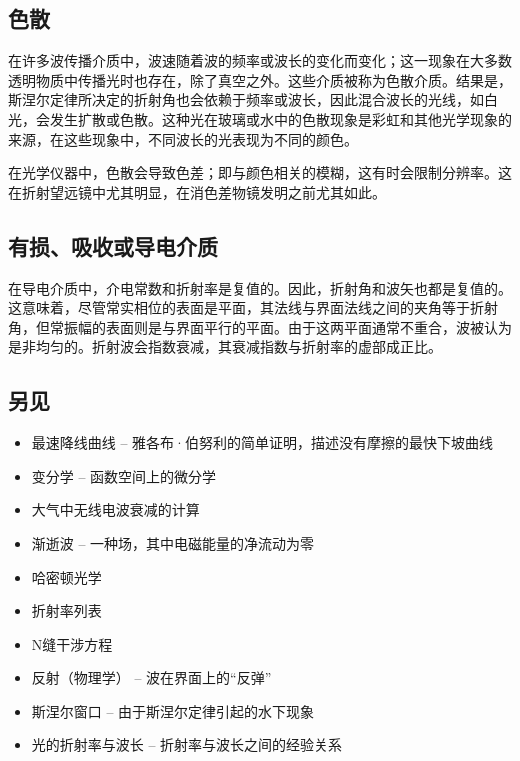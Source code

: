 \subsection{色散}  
在许多波传播介质中，波速随着波的频率或波长的变化而变化；这一现象在大多数透明物质中传播光时也存在，除了真空之外。这些介质被称为色散介质。结果是，斯涅尔定律所决定的折射角也会依赖于频率或波长，因此混合波长的光线，如白光，会发生扩散或色散。这种光在玻璃或水中的色散现象是彩虹和其他光学现象的来源，在这些现象中，不同波长的光表现为不同的颜色。

在光学仪器中，色散会导致色差；即与颜色相关的模糊，这有时会限制分辨率。这在折射望远镜中尤其明显，在消色差物镜发明之前尤其如此。
\subsection{有损、吸收或导电介质} 
在导电介质中，介电常数和折射率是复值的。因此，折射角和波矢也都是复值的。这意味着，尽管常实相位的表面是平面，其法线与界面法线之间的夹角等于折射角，但常振幅的表面则是与界面平行的平面。由于这两平面通常不重合，波被认为是非均匀的。折射波会指数衰减，其衰减指数与折射率的虚部成正比。
\subsection{另见}  
\begin{itemize}
\item 最速降线曲线 – 雅各布·伯努利的简单证明，描述没有摩擦的最快下坡曲线  
\item 变分学 – 函数空间上的微分学  
\item 大气中无线电波衰减的计算  
\item 渐逝波 – 一种场，其中电磁能量的净流动为零  
\item 哈密顿光学  
\item 折射率列表 
\item N缝干涉方程  
\item 反射（物理学） – 波在界面上的“反弹”  
\item 斯涅尔窗口 – 由于斯涅尔定律引起的水下现象  
\item 光的折射率与波长 – 折射率与波长之间的经验关系
\end{itemize}
